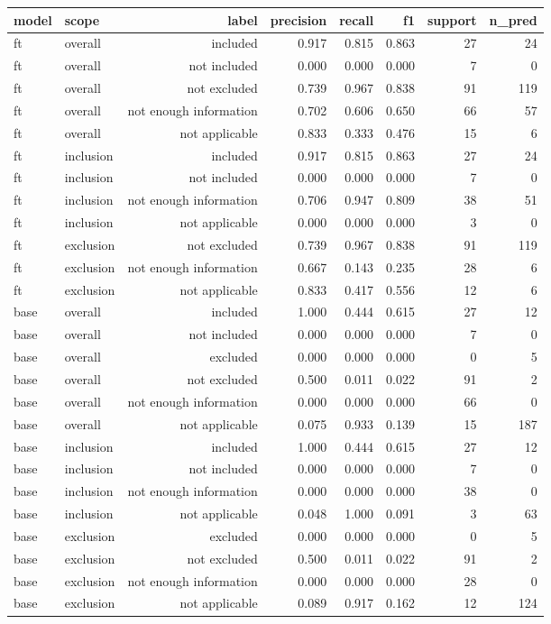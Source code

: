 \begin{tabular}{llrrrrrr}
\toprule
model & scope & label & precision & recall & f1 & support & n\_pred \\
\midrule
ft & overall & included & 0.917 & 0.815 & 0.863 & 27 & 24 \\
ft & overall & not included & 0.000 & 0.000 & 0.000 & 7 & 0 \\
ft & overall & not excluded & 0.739 & 0.967 & 0.838 & 91 & 119 \\
ft & overall & not enough information & 0.702 & 0.606 & 0.650 & 66 & 57 \\
ft & overall & not applicable & 0.833 & 0.333 & 0.476 & 15 & 6 \\
ft & inclusion & included & 0.917 & 0.815 & 0.863 & 27 & 24 \\
ft & inclusion & not included & 0.000 & 0.000 & 0.000 & 7 & 0 \\
ft & inclusion & not enough information & 0.706 & 0.947 & 0.809 & 38 & 51 \\
ft & inclusion & not applicable & 0.000 & 0.000 & 0.000 & 3 & 0 \\
ft & exclusion & not excluded & 0.739 & 0.967 & 0.838 & 91 & 119 \\
ft & exclusion & not enough information & 0.667 & 0.143 & 0.235 & 28 & 6 \\
ft & exclusion & not applicable & 0.833 & 0.417 & 0.556 & 12 & 6 \\
base & overall & included & 1.000 & 0.444 & 0.615 & 27 & 12 \\
base & overall & not included & 0.000 & 0.000 & 0.000 & 7 & 0 \\
base & overall & excluded & 0.000 & 0.000 & 0.000 & 0 & 5 \\
base & overall & not excluded & 0.500 & 0.011 & 0.022 & 91 & 2 \\
base & overall & not enough information & 0.000 & 0.000 & 0.000 & 66 & 0 \\
base & overall & not applicable & 0.075 & 0.933 & 0.139 & 15 & 187 \\
base & inclusion & included & 1.000 & 0.444 & 0.615 & 27 & 12 \\
base & inclusion & not included & 0.000 & 0.000 & 0.000 & 7 & 0 \\
base & inclusion & not enough information & 0.000 & 0.000 & 0.000 & 38 & 0 \\
base & inclusion & not applicable & 0.048 & 1.000 & 0.091 & 3 & 63 \\
base & exclusion & excluded & 0.000 & 0.000 & 0.000 & 0 & 5 \\
base & exclusion & not excluded & 0.500 & 0.011 & 0.022 & 91 & 2 \\
base & exclusion & not enough information & 0.000 & 0.000 & 0.000 & 28 & 0 \\
base & exclusion & not applicable & 0.089 & 0.917 & 0.162 & 12 & 124 \\
\bottomrule
\end{tabular}
